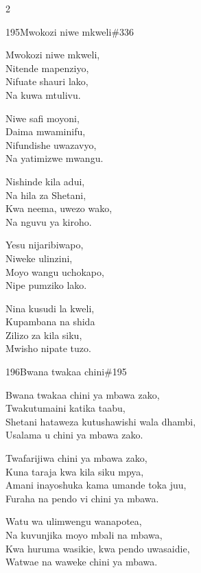\documentclass{article}
\begin{document}
\begin{multicols}{2}
\begin{hymn}{195}{Mwokozi niwe mkweli}{\#336}
\begin{stanza}
Mwokozi niwe mkweli,\\
Nitende mapenziyo,\\
Nifuate shauri lako,\\
Na kuwa mtulivu.
\end{stanza}
\begin{chorus}
Niwe safi moyoni,\\
Daima mwaminifu,\\
Nifundishe uwazavyo,\\
Na yatimizwe mwangu.
\end{chorus}
\begin{stanza}
Nishinde kila adui,\\
Na hila za Shetani,\\
Kwa neema, uwezo wako,\\
Na nguvu ya kiroho.
\end{stanza}
\begin{stanza}
Yesu nijaribiwapo,\\
Niweke ulinzini,\\
Moyo wangu uchokapo,\\
Nipe pumziko lako.
\end{stanza}
\begin{stanza}
Nina kusudi la kweli,\\
Kupambana na shida\\
Zilizo za kila siku,\\
Mwisho nipate tuzo.
\end{stanza}
\end{hymn}

\begin{hymn}{196}{Bwana twakaa chini}{\#195}
\begin{stanza}
Bwana twakaa chini ya mbawa zako,\\
Twakutumaini katika taabu,\\
Shetani hataweza kutushawishi wala dhambi,\\
Usalama u chini ya mbawa zako.
\end{stanza}
\begin{stanza}
Twafarijiwa chini ya mbawa zako,\\
Kuna taraja kwa kila siku mpya,\\
Amani inayoshuka kama umande toka juu,\\
Furaha na pendo vi chini ya mbawa.
\end{stanza}
\begin{stanza}
Watu wa ulimwengu wanapotea,\\
Na kuvunjika moyo mbali na mbawa,\\
Kwa huruma wasikie, kwa pendo uwasaidie,\\
Watwae na waweke chini ya mbawa.
\end{stanza}
\end{hymn}


\end{multicols}
\end{document}
